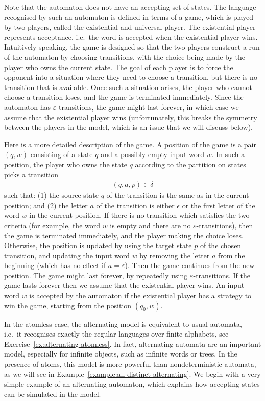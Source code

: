 Note that the automaton does not have an accepting set of states.
The language recognised by such an automaton is defined in terms of a game, which is played by two players, called the existential and universal player. The existential player represents acceptance, i.e.~the word is accepted when the existential player wins.  Intuitively speaking, the game is designed so that the two   players construct a run of the automaton by  choosing transitions, with the choice being made by the player who owns the current state. The goal of each player is to force the opponent into a situation where they need to choose a transition, but there is no transition that is available. Once such a situation arises, the player who cannot choose a transition loses, and the game is terminated immediately. Since the automaton has $\varepsilon$-transitions, the game might last forever, in which case we assume that the existential player wins (unfortunately, this breaks the symmetry between the players in the  model, which is an issue that we will discuss below).

Here is a more detailed description of the game.
A position of the game  is a pair $(q,w)$ consisting of a state $q$ and a possibly empty input word $w$. In such a position, the player who owns the state $q$ according to the partition on states picks a transition 
\begin{align*}
(q,a,p) \in \delta
\end{align*}
such that: (1) the source state $q$ of the transition is the same as in the current position; and (2) the letter $a$ of the transition is either $\epsilon$ or  the first letter of the word $w$ in the current position. If there is no  transition which satisfies the two criteria (for example, the word $w$ is empty and there are no $\varepsilon$-transitions), then the game is terminated immediately, and the  player making the choice loses. Otherwise, the position is updated by using the target state $p$ of the chosen transition, and updating the input word $w$ by removing the letter $a$ from the beginning (which has no effect if $a = \varepsilon$). Then the game continues from the new position. The game might last forever, by repeatedly using $\varepsilon$-transitions. If the game lasts forever then we assume that the existential player wins. An input word $w$ is accepted by the automaton if the existential player has a strategy to win the game, starting from the position $(q_0,w)$.

In the atomless case, the alternating model is equivalent to usual automata, i.e.~it recognises exactly the regular languages over finite alphabets, see Exercise~\ref{ex:alternating-atomless}. In fact, alternating automata are an important model, especially for infinite objects, such as infinite words or trees.
 In the presence of atoms, this model is more powerful than nondeterministic automata, as we will see in Example~\ref{example:all-distinct-alternating}.
We begin with a very simple example of an alternating automaton, which explains how accepting states can be simulated in the model.


